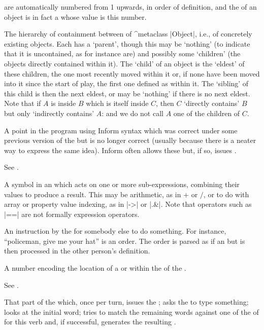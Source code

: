 %
 are automatically numbered from 1 upwards, in order of
definition, and the  of an object is in fact a 
whose value is this number.

%
The hierarchy of containment between  of ^{metaclass} |Object|,
i.e., of concretely existing objects.  Each has a `parent',
though this may be `nothing' (to indicate that it is uncontained, as for
instance  are) and possibly some `children' (the objects directly
contained within it).  The `child' of an object is the `eldest' of these
children, the one most recently moved within it or, if none have been moved
into it since the start of play, the first one defined as within it.  The
`sibling' of this child is then the next eldest, or may be `nothing' if
there is no next eldest.  Note that if $A$ is inside $B$ which is itself
inside $C$, then $C$ `directly contains' $B$ but only `indirectly
contains' $A$: and we do not call $A$ one of the children of $C$.

%
A point in the program using Inform syntax which was correct under some
previous version of the  but is no longer correct (usually
because there is a neater way to express the same idea).  Inform often
allows these but, if so, issues .

%
See .

%
A symbol in an  which acts on one or more sub-expressions,
combining their values to produce a result.  This may be arithmetic, as
in $+$ or $/$, or to do with array or property value indexing, as in
|->| or |.&|.  Note that  operators such as |==| are not
formally expression operators.

%
An instruction by the  for somebody else to do something.  For
instance, ``policeman, give me your hat'' is an order.  The order is
parsed as if an  but is then processed in the other person's
 definition.

%
A number encoding the location of a  or  within
the  of the .

%
See .

%
That part of the  which, once per turn, issues the ;
asks the  to type something; looks at the initial  word; tries
to match the remaining words against one of the  of  for
this verb and, if successful, generates the resulting .


